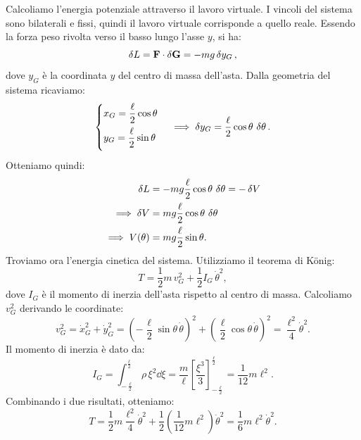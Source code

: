 \begin{example}
    Calcoliamo l'energia potenziale attraverso il lavoro virtuale. I vincoli del sistema sono bilaterali e fissi, quindi il lavoro virtuale corrisponde a quello reale. Essendo la forza peso rivolta verso il basso lungo l'asse $y$, si ha:
    \begin{equation*}
        \var{L} = \vb{F}\cdot \var{\vb{G}} = -mg\var{y_G},
    \end{equation*}
    dove $y_G$ è la coordinata $y$ del centro di massa dell'asta. Dalla geometria del sistema ricaviamo:
    \begin{equation*}
        \begin{cases}
            \displaystyle x_G = \frac{\ell}{2}\cos\theta \\[0.7em]
            \displaystyle y_G = \frac{\ell}{2}\sin\theta \\[0.7em]   
        \end{cases}
        \implies \var{y_G} = \frac{\ell}{2}\cos\theta\,\var{\theta}.
    \end{equation*}
    Otteniamo quindi:
    \begin{align*}
        \var{L} &= -mg\frac{\ell}{2}\cos\theta\,\var{\theta} = -\var{V} \\
        \implies \var{V} &= mg\frac{\ell}{2}\cos\theta\,\var{\theta} \\
        \implies V(\theta) &= mg\frac{\ell}{2}\sin\theta.
    \end{align*}
    Troviamo ora l'energia cinetica del sistema. Utilizziamo il teorema di König:
    \begin{equation*}
        T= \frac{1}{2}m\,v_G^2 + \frac{1}{2}I_G\,\dot{\theta}^2,
    \end{equation*}
    dove $I_G$ è il momento di inerzia dell'asta rispetto al centro di massa.
    Calcoliamo $v_G^2$ derivando le coordinate:
    \begin{equation*}
        v_G^2 = \dot{x}_G^2 + \dot{y}_G^2 = \left(-\frac{\ell}{2}\sin\theta\,\dot{\theta}\right)^2 + \left(\frac{\ell}{2}\cos\theta\,\dot{\theta}\right)^2 = \frac{\ell^2}{4}\dot{\theta}^2.
    \end{equation*}
    Il momento di inerzia è dato da:
    \begin{equation*}
        I_G =  \int_{-\frac{\ell}{2}}^{\frac{\ell}{2}} \rho \,\xi^2 \dd{\xi} = \frac{m}{\ell} \left[\frac{\xi^3}{3}\right]_{-\frac{\ell}{2}}^{\frac{\ell}{2}} = \frac{1}{12}m\ell^2.
    \end{equation*}
    Combinando i due risultati, otteniamo:
    \begin{equation*}
        T = \frac{1}{2}m\frac{\ell^2}{4}\dot{\theta}^2 + \frac{1}{2}\left(\frac{1}{12}m\ell^2\right)\dot{\theta}^2 = \frac{1}{6}m\ell^2\dot{\theta}^2.
    \end{equation*}


\end{example}

